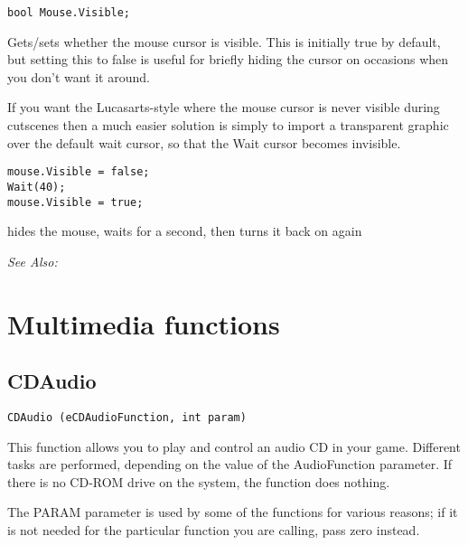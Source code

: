 \begin{verbatim}
bool Mouse.Visible;
\end{verbatim}
Gets/sets whether the mouse cursor is visible. This is initially true by default,
but setting this to false is useful for briefly hiding the cursor on occasions
when you don't want it around.

If you want the Lucasarts-style where the mouse cursor is never visible during cutscenes
then a much easier solution is simply to import a transparent graphic over the default
wait cursor, so that the Wait cursor becomes invisible.

\begin{verbatim}
mouse.Visible = false;
Wait(40);
mouse.Visible = true;
\end{verbatim}
hides the mouse, waits for a second, then turns it back on again

\it{See Also:} 


\section{Multimedia functions}%

\subsection{CDAudio}\label{CDAudio}%

\begin{verbatim}
CDAudio (eCDAudioFunction, int param)
\end{verbatim}
This function allows you to play and control an audio CD in your game.
Different tasks are performed, depending on the value of the AudioFunction
parameter. If there is no CD-ROM drive on the system, the function does
nothing.

The PARAM parameter is used by some of the functions for various reasons; if
it is not needed for the particular function you are calling, pass zero
instead.

